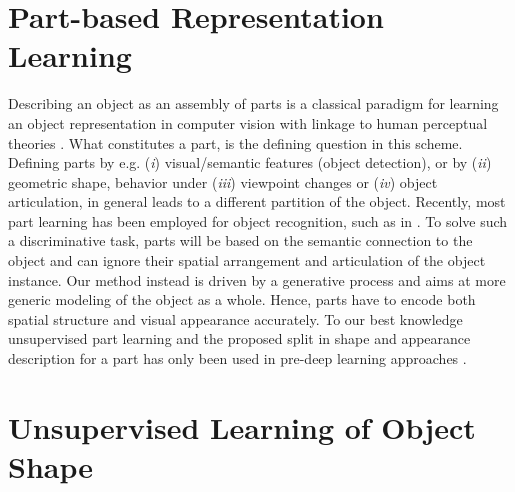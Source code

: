 \section{Part-based Representation Learning}
	Describing an object as an assembly of parts is a classical paradigm for learning an object representation in computer vision \cite{ross06parts} with linkage to human perceptual theories \cite{biederman87recognition}.
	What constitutes a part, is the defining question in this scheme.
	Defining parts by e.g. (\emph{i}) visual/semantic features (object detection), or by (\emph{ii}) geometric shape, behavior under (\emph{iii}) viewpoint changes or (\emph{iv}) object articulation, in general leads to a different partition of the object.
	Recently, most part learning has been employed for object recognition, such as in \cite{felzenszwalb10dpm, novotny17anchornet, singh12patch, mesnil13partssemantic, yang16dpmpose, lam17finerecognize}.
	To solve such a discriminative task, parts will be based on the semantic connection to the object and can ignore their spatial arrangement and articulation of the object instance. Our method instead is driven by a generative process and aims at more generic modeling of the object as a whole. Hence, parts have to encode both spatial structure and visual appearance accurately. To our best knowledge unsupervised part learning and the proposed split in shape and appearance description for a part has only been used in pre-deep learning approaches \cite{ross06parts, nguyen13nonnegative, cootes98activeappear}.


\section{Unsupervised Learning of Object Shape}\label{sec:shapelearning}

